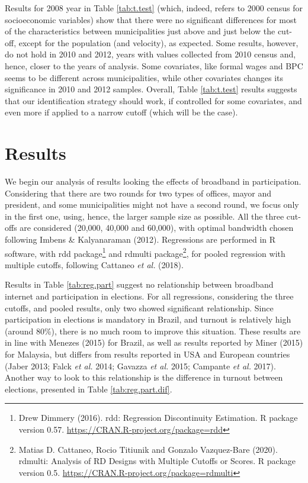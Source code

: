 \documentclass[
  12pt,
]{article}
\begin{document}
Results for 2008 year in Table \ref{tab:t.test} (which, indeed, refers
to 2000 census for socioeconomic variables) show that there were no
significant differences for most of the characteristics between
municipalities just above and just below the cut-off, except for the
population (and velocity), as expected. Some results, however, do not
hold in 2010 and 2012, years with values collected from 2010 census and,
hence, closer to the years of analysis. Some covariates, like formal
wages and BPC seems to be different across municipalities, while other
covariates changes its significance in 2010 and 2012 samples. Overall,
Table \ref{tab:t.test} results suggests that our identification strategy
should work, if controlled for some covariates, and even more if applied
to a narrow cutoff (which will be the case).

\hypertarget{results}{%
\section{Results}\label{results}}

We begin our analysis of results looking the effects of broadband in
participation. Considering that there are two rounds for two types of
offices, mayor and president, and some municipalities might not have a
second round, we focus only in the first one, using, hence, the larger
sample size as possible. All the three cut-offs are considered (20,000,
40,000 and 60,000), with optimal bandwidth chosen following Imbens \&
Kalyanaraman (2012). Regressions are performed in R software, with rdd
package\footnote{Drew Dimmery (2016). rdd: Regression Discontinuity
  Estimation. R package version 0.57.
  \url{https://CRAN.R-project.org/package=rdd}} and rdmulti
package\footnote{Matias D. Cattaneo, Rocio Titiunik and Gonzalo
  Vazquez-Bare (2020). rdmulti: Analysis of RD Designs with Multiple
  Cutoffs or Scores. R package version 0.5.
  \url{https://CRAN.R-project.org/package=rdmulti}}, for pooled
regression with multiple cutoffs, following Cattaneo \emph{et al.}
(2018).

Results in Table \ref{tab:reg.part} suggest no relationship between
broadband internet and participation in elections. For all regressions,
considering the three cutoffs, and pooled results, only two showed
significant relationship. Since participation in elections is mandatory
in Brazil, and turnout is relatively high (around 80\%), there is no
much room to improve this situation. These results are in line with
Menezes (2015) for Brazil, as well as results reported by Miner (2015)
for Malaysia, but differs from results reported in USA and European
countries (Jaber 2013; Falck \emph{et al.} 2014; Gavazza \emph{et al.}
2015; Campante \emph{et al.} 2017). Another way to look to this
relationship is the difference in turnout between elections, presented
in Table \ref{tab:reg.part.dif}.
\end{document}
